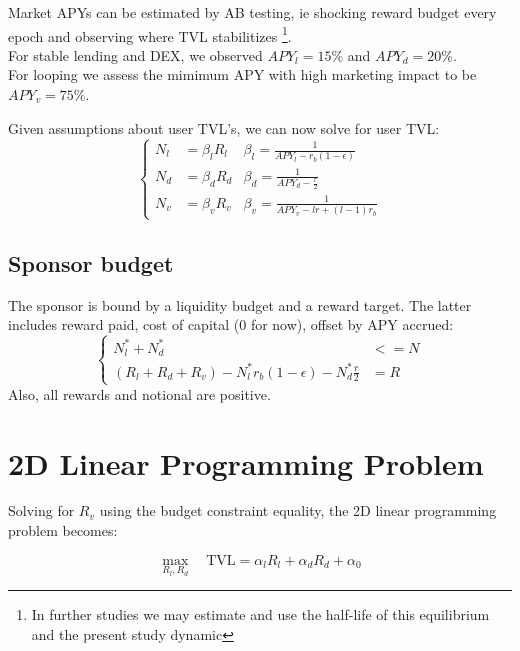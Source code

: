 \documentclass{article}
\begin{document}
    Market APYs can be estimated by AB testing, ie shocking reward budget every epoch and observing where TVL stabilitizes 
    \footnote{In further studies we may estimate and use the half-life of this equilibrium and the present study dynamic}. \\
    For stable lending and DEX, we observed $APY_l=15\%$ and $APY_d=20\%$. \\
    For looping we assess the mimimum APY with high marketing impact to be $APY_v=75\%$.

    Given assumptions about user TVL's, we can now solve for user TVL:
    \begin{equation}
    \left\{
    \begin{aligned}
        N_l &= \beta_l R_l &\beta_l=\frac{1}{APY_l - r_b(1-\epsilon)}\\
        N_d &= \beta_d R_d &\beta_d=\frac{1}{APY_d - \frac{r}{2}}\\
        N_v &= \beta_v R_v &\beta_v=\frac{1}{APY_v - lr + (l-1)r_b}
    \end{aligned}
    \right.
    \label{eq:user_tvl_relationships}
    \end{equation}


\subsection{Sponsor budget}

The sponsor is bound by a liquidity budget and a reward target.
The latter includes reward paid, cost of capital (0 for now), offset by APY accrued:
\begin{equation*}
    \left\{
    \begin{aligned}
    N_l^* + N_d^* &<= N\\
    (R_l+R_d+R_v) - N_l^* r_b(1-\epsilon) - N_d^* \frac{r}{2} &= R
    \end{aligned}
    \right.
\end{equation*}
Also, all rewards and notional are positive.

\section{2D Linear Programming Problem}

Solving for $R_v$ using the budget constraint equality, the 2D linear programming problem becomes:

\begin{equation}
\max_{R_l, R_d} \quad \text{TVL} = \alpha_l R_l + \alpha_d R_d + \alpha_0
\end{equation}
\end{document}
